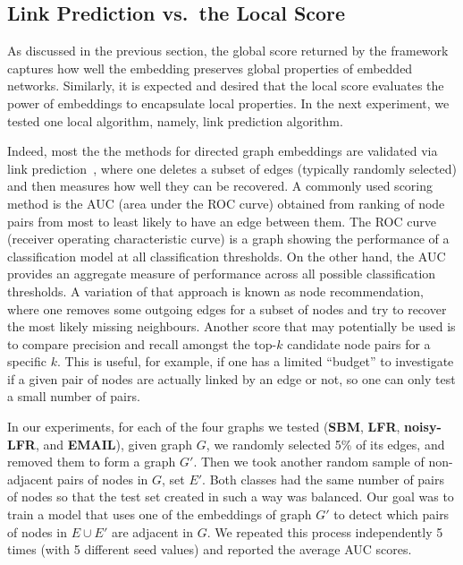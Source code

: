 \documentclass[11pt]{article}
\begin{document}
\subsection{Link Prediction vs.\ the Local Score}\label{sec:correlation_with_local_score}

As discussed in the previous section, the global score returned by the framework captures how well the embedding preserves global properties of embedded networks. Similarly, it is expected and desired that the local score evaluates the power of embeddings to encapsulate local properties. In the next experiment, we tested one local algorithm, namely, link prediction algorithm.

\medskip

Indeed, most the the methods for directed graph embeddings are validated via link prediction~\cite{Zhou2021}, where one deletes a subset of edges (typically randomly selected) and then measures how well they can be recovered. A commonly used scoring method is the AUC (area under the ROC curve) obtained from ranking of node pairs from most to least likely to have an edge between them. The ROC curve (receiver operating characteristic curve) is a graph showing the performance of a classification model at all classification thresholds. On the other hand, the AUC provides an aggregate measure of performance across all possible classification thresholds. 
A variation of that approach is known as node recommendation, where one removes some outgoing edges for a subset of nodes and try to recover the most likely missing neighbours. Another score that may potentially be used is to compare precision and recall amongst the top-$k$ candidate node pairs for a specific $k$. This is useful, for example, if one has a limited ``budget'' to investigate if a given pair of nodes are actually linked by an edge or not, so one can only test a small number of pairs.

In our experiments, for each of the four graphs we tested (\textbf{SBM}, \textbf{LFR}, \textbf{noisy-LFR}, and \textbf{EMAIL}), given graph $G$, we randomly selected 5\% of its edges, and removed them to form a graph $G'$. Then we took another random sample of non-adjacent pairs of nodes in $G$, set $E'$. Both classes had the same number of pairs of nodes so that the test set created in such a way was balanced. Our goal was to train a model that uses one of the embeddings of graph $G'$ to detect which pairs of nodes in $E \cup E'$ are adjacent in $G$. We repeated this process independently 5 times (with 5 different seed values) and reported the average AUC scores.
\end{document}

